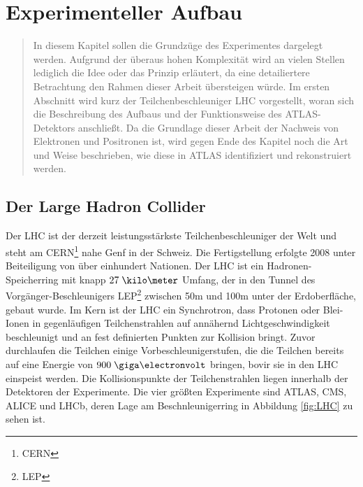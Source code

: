 
\chapter{Experimenteller Aufbau}
\label{experimenteller_aufbau}

\begin{quote}
    In diesem Kapitel sollen die Grundzüge des Experimentes dargelegt werden.
    Aufgrund der überaus hohen Komplexität wird an vielen Stellen lediglich die
    Idee oder das Prinzip erläutert, da eine detailiertere Betrachtung den
    Rahmen dieser Arbeit übersteigen würde. Im ersten Abschnitt wird kurz der
    Teilchenbeschleuniger \acs{LHC} vorgestellt, woran sich die Beschreibung
    des Aufbaus und der Funktionsweise des ATLAS-Detektors anschließt. Da die
    Grundlage dieser Arbeit der Nachweis von Elektronen und Positronen ist,
    wird gegen Ende des Kapitel noch die Art und Weise beschrieben, wie diese
    in ATLAS identifiziert und rekonstruiert werden.
\end{quote}



%
\section{Der Large Hadron Collider}
\label{lhc}

Der \acf{LHC} ist der derzeit leistungsstärkste Teilchenbeschleuniger der Welt
und steht am CERN\footnote{\acf{CERN}} nahe Genf in der Schweiz. Die
Fertigstellung erfolgte 2008 unter Beiteiligung von über einhundert Nationen.
Der \ac{LHC} ist ein Hadronen-Speicherring mit knapp $27\;\kilo\meter$ Umfang,
der in den Tunnel des Vorgänger-Beschleunigers LEP\footnote{\acf{LEP}} zwischen
50m und 100m unter der Erdoberfläche, gebaut wurde. Im Kern ist der
\ac{LHC} ein Synchrotron, dass Protonen oder Blei-Ionen in gegenläufigen
Teilchenstrahlen auf annähernd Lichtgeschwindigkeit beschleunigt und an
fest definierten Punkten zur Kollision bringt. Zuvor durchlaufen die Teilchen
einige Vorbeschleunigerstufen, die die Teilchen bereits auf eine Energie von
$900\GeV$ bringen, bovir sie in den \ac{LHC} einspeist werden. Die
Kollisionspunkte der Teilchenstrahlen liegen innerhalb der Detektoren der
Experimente. Die vier größten Experimente sind \acs{ATLAS}, CMS, ALICE und
LHCb, deren Lage am Beschnleunigerring in Abbildung \ref{fig:LHC} zu sehen ist.

